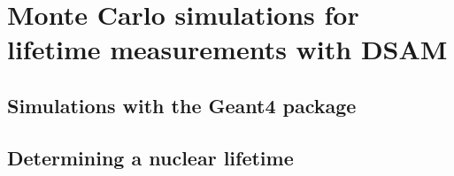 %
%
%
%
%
%
%
%
%
%


%
%

\chapter{Monte Carlo simulations for lifetime measurements with DSAM}
\label{chap: simulation}

\section{Simulations with the Geant4 package}
\label{sec: geant}

\section{Determining a nuclear lifetime}
\label{sec: lifetime simulation}

%
% 
% 
